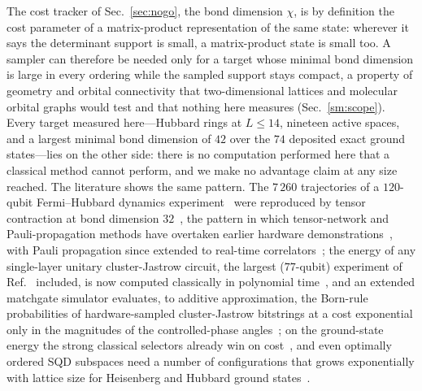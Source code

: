 The cost tracker of Sec.~\ref{sec:nogo}, the bond dimension $\chi$, is by definition the cost
parameter of a matrix-product representation of the same state: wherever it says the determinant
support is small, a matrix-product state is small too. A sampler can therefore be needed only for a
target whose minimal bond dimension is large in every ordering while the sampled support stays
compact, a property of geometry and orbital connectivity that two-dimensional lattices and molecular
orbital graphs would test and that nothing here measures (Sec.~\ref{sm:scope}). Every target measured
here---Hubbard rings at $L\le14$, nineteen active spaces, and a largest minimal bond dimension of $42$
over the $74$ deposited exact ground states---lies on the other side: there is no computation
performed here that a classical method cannot perform, and we make no advantage claim at any size
reached. The literature shows the same pattern. The $7\,260$ trajectories of a $120$-qubit
Fermi--Hubbard dynamics experiment~\cite{qctrlfh2026} were reproduced by tensor contraction at bond
dimension $32$~\cite{ouyang2026}, the pattern in which tensor-network and Pauli-propagation methods
have overtaken earlier hardware demonstrations~\cite{kim2023,tindall2024,begusic2024}, with Pauli
propagation since extended to real-time correlators~\cite{kemper2026};
the energy of any single-layer unitary cluster-Jastrow circuit, the largest ($77$-qubit) experiment of
Ref.~\cite{robledomoreno2025} included, is now computed classically in polynomial
time~\cite{belagali2026}, and an extended matchgate simulator evaluates, to additive approximation,
the Born-rule probabilities of hardware-sampled cluster-Jastrow bitstrings at a cost exponential only in
the magnitudes of the controlled-phase angles~\cite{extraferm}; on the ground-state energy the strong classical selectors already win on
cost~\cite{reinholdt2025,zhangotten2026}, and even optimally ordered SQD subspaces need a number of
configurations that grows exponentially with lattice size for Heisenberg and Hubbard ground
states~\cite{gaberle2026}.

